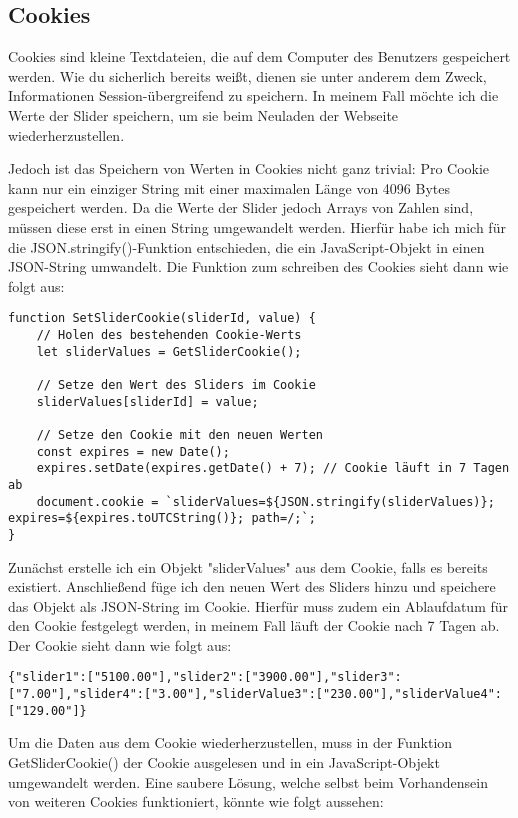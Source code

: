 \subsection{Cookies}

Cookies sind kleine Textdateien, die auf dem Computer des Benutzers gespeichert werden. Wie du sicherlich bereits weißt, dienen sie unter anderem dem Zweck, Informationen Session-übergreifend zu speichern. In meinem Fall möchte ich die Werte der Slider speichern, um sie beim Neuladen der Webseite wiederherzustellen.

Jedoch ist das Speichern von Werten in Cookies nicht ganz trivial: Pro Cookie kann nur ein einziger String mit einer maximalen Länge von 4096 Bytes gespeichert werden. Da die Werte der Slider jedoch Arrays von Zahlen sind, müssen diese erst in einen String umgewandelt werden. Hierfür habe ich mich für die JSON.stringify()-Funktion entschieden, die ein JavaScript-Objekt in einen JSON-String umwandelt. Die Funktion zum schreiben des Cookies sieht dann wie folgt aus:

\begin{lstlisting}[style=JavaScript]
function SetSliderCookie(sliderId, value) {
    // Holen des bestehenden Cookie-Werts
    let sliderValues = GetSliderCookie();

    // Setze den Wert des Sliders im Cookie
    sliderValues[sliderId] = value;

    // Setze den Cookie mit den neuen Werten
    const expires = new Date();
    expires.setDate(expires.getDate() + 7); // Cookie läuft in 7 Tagen ab
    document.cookie = `sliderValues=${JSON.stringify(sliderValues)}; expires=${expires.toUTCString()}; path=/;`;
}
\end{lstlisting}

Zunächst erstelle ich ein Objekt "sliderValues" aus dem Cookie, falls es bereits existiert. Anschließend füge ich den neuen Wert des Sliders hinzu und speichere das Objekt als JSON-String im Cookie. Hierfür muss zudem ein Ablaufdatum für den Cookie festgelegt werden, in meinem Fall läuft der Cookie nach 7 Tagen ab. Der Cookie sieht dann wie folgt aus:

\begin{lstlisting}[style=JavaScript]
{"slider1":["5100.00"],"slider2":["3900.00"],"slider3":["7.00"],"slider4":["3.00"],"sliderValue3":["230.00"],"sliderValue4":["129.00"]}
\end{lstlisting}

Um die Daten aus dem Cookie wiederherzustellen, muss in der Funktion GetSliderCookie() der Cookie ausgelesen und in ein JavaScript-Objekt umgewandelt werden. Eine saubere Lösung, welche selbst beim Vorhandensein von weiteren Cookies funktioniert, könnte wie folgt aussehen:


